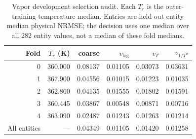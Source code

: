 \begin{table}[h]
  \centering
  \small
  \caption{Vapor development selection audit.  Each $T_r$ is the outer-training
  temperature median.  Entries are held-out entity median physical NRMSE; the
  decision uses one median over all 282 entity values, not a median of these fold
  medians.}
  \label{tab:vapor-selection-audit}
  \setlength{\tabcolsep}{4pt}
  \begin{tabular}{@{}rrrrrr@{}}
    \toprule
    Fold & $T_r$ (K) & coarse & $v_{\log}$ & $v_T$ & $v_{1/T^2}$ \\
    \midrule
    0 & 360.000 & 0.08137 & 0.01105 & 0.03073 & 0.03631 \\
    1 & 367.900 & 0.04556 & 0.01015 & 0.01223 & 0.01035 \\
    2 & 362.860 & 0.04135 & 0.01555 & 0.01802 & 0.01591 \\
    3 & 360.445 & 0.03867 & 0.00548 & 0.00871 & 0.00716 \\
    4 & 363.090 & 0.02487 & 0.01243 & 0.01263 & 0.01214 \\
    \midrule
    All entities & --- & 0.04349 & 0.01105 & 0.01420 & 0.01258 \\
    \bottomrule
  \end{tabular}
\end{table}

